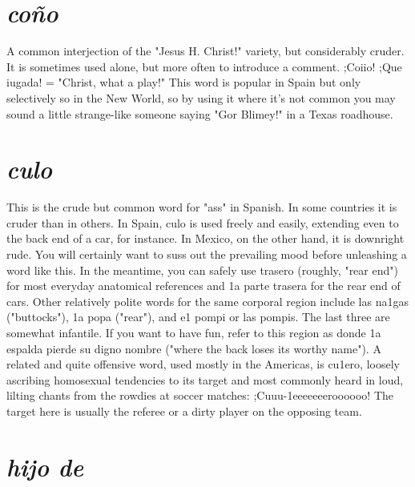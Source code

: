 \section{\emph{coño}}

A common interjection of the "Jesus H. Christ!" variety, but
considerably cruder. It is sometimes used alone, but more often to introduce a comment. ;Coiio! ;Que iugada! = "Christ, what a play!"
This word is popular in Spain but only selectively so in the New
World, so by using it where it's not common you may sound a little
strange-like someone saying "Gor Blimey!" in a Texas roadhouse.

\section{\emph{culo}}

This is the crude but common word for "ass" in Spanish. In
some countries it is cruder than in others. In Spain, culo is used freely
and easily, extending even to the back end of a car, for instance. In
Mexico, on the other hand, it is downright rude. You will certainly
want to suss out the prevailing mood before unleashing a word like
this. In the meantime, you can safely use trasero (roughly, "rear end")
for most everyday anatomical references and 1a parte trasera for the
rear end of cars. Other relatively polite words for the same corporal region include las na1gas ("buttocks"), 1a popa ("rear"), and e1 pompi or
las pompis. The last three are somewhat infantile. If you want to have
fun, refer to this region as donde 1a espalda pierde su digno nombre
("where the back loses its worthy name").
A related and quite offensive word, used mostly in the Americas, is cu1ero, loosely ascribing homosexual tendencies to its target
and most commonly heard in loud, lilting chants from the rowdies at
soccer matches: ;Cuuu-1eeeeeeeroooooo! The target here is usually the
referee or a dirty player on the opposing team.

\section{\emph{hijo de}}

